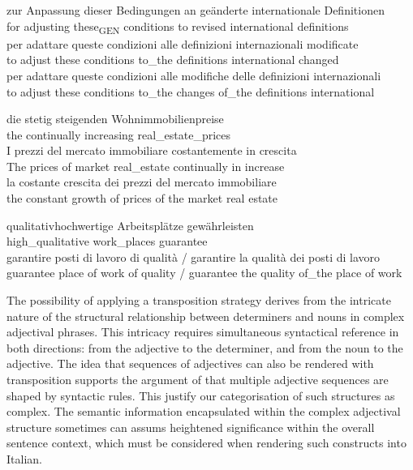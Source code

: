 \documentclass[output=paper,colorlinks,citecolor=brown]{langscibook}
\begin{document}
\ea%
    \label{ex:resi:59}
\ea
\gll  zur  Anpassung  dieser  Bedingungen  an  geänderte  internationale  Definitionen \\
  for  adjusting  these\textsubscript{GEN} conditions  to  revised  international  definitions  \\
 \ex
 \gll  per  adattare  queste  condizioni  alle  definizioni  internazionali  modificate\\
        to  adjust  these  conditions  to\_the  definitions  international  changed\\
\ex
  \gll  per  adattare  queste  condizioni  alle  modifiche  delle  definizioni  internazionali\\
    to   adjust  these     conditions  to\_the  changes  of\_the  definitions  international\\
  \z
\z

\ea%
    \label{ex:resi:60}
\ea
\gll  die  stetig  steigenden  Wohnimmobilienpreise \\
    the  continually  increasing  real\_estate\_prices \\
\ex
  \gll  I  prezzi  del  mercato  immobiliare  costantemente  in  crescita\\
    The  prices  of  market  real\_estate  continually    in increase\\
\ex
  \gll  la  costante  crescita  dei  prezzi  del  mercato  immobiliare\\
    the  constant  growth  of  prices  of the  market  real estate\\
  \z
\z

\ea%
    \label{ex:resi:61}
\ea
\gll  qualitativhochwertige  Arbeitsplätze  gewährleisten \\
   high\_qualitative  work\_places  guarantee  \\
\ex
\gll  garantire  posti di lavoro  di  qualità /  garantire  la  qualità  dei  posti di lavoro\\
      guarantee  place of work  of  quality  /   guarantee  the  quality  of\_the  place of work\\
\z\z


The possibility of applying a transposition strategy derives from the intricate nature of the structural relationship between determiners and nouns in complex adjectival phrases. This intricacy requires simultaneous syntactical reference in both directions: from the adjective to the determiner, and from the noun to the adjective. The idea that sequences of adjectives can also be rendered with transposition supports the argument of \citet{KotowskiHärtl2019} that multiple adjective sequences are shaped by syntactic rules. This justify our categorisation of such structures as complex. The semantic information encapsulated within the complex adjectival structure sometimes can assums heightened significance within the overall sentence context, which must be considered when rendering such constructs into Italian.
\end{document}
